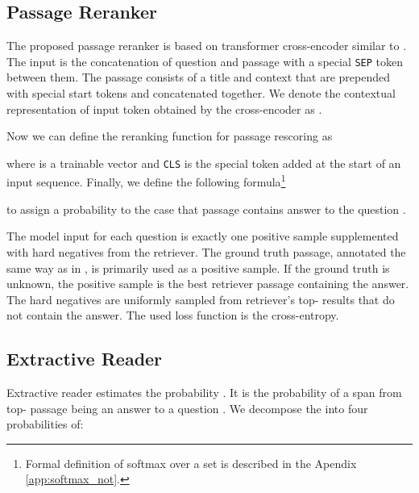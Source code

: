 \documentclass[11pt]{article}
\begin{document}
\subsection{Passage Reranker}\label{ss:reranker}








The proposed passage reranker is based on transformer cross-encoder similar to \citet{nogueira2019passage, luan2020sparse}.
The input is the concatenation of question  and passage  with a special \texttt{SEP} token between them. The passage consists of a title and context that are prepended with special start tokens and concatenated together.
We denote the contextual representation of input token  obtained by the cross-encoder as .

Now we can define the reranking function for passage rescoring as

where  is a trainable vector and \texttt{CLS} is the special token added at the start of an input sequence.
Finally, we define the following formula\footnote{Formal definition of softmax over a set is described in the Apendix \ref{app:softmax_not}.}

to assign a probability to the case that passage  contains answer to the question .

\begin{description}[style=unboxed,leftmargin=0em,listparindent=\parindent]
    \setlength\parskip{0em}
\item[Training.] The model input for each question is exactly one positive sample supplemented with hard negatives from the retriever. The ground truth passage, annotated the same way as in \citet{karpukhin2020dense}, is primarily used as a positive sample. If the ground truth is unknown, the positive sample is the best retriever passage containing the answer.
The hard negatives are uniformly sampled from retriever's top- results that do not contain the answer. 
The used loss function is the cross-entropy.
\end{description}


\subsection{Extractive Reader}
\label{ss:ext_reader}

Extractive reader estimates the probability . 
It is the probability of a span  from top- passage  being an answer to a question . 
We decompose the  into four probabilities of:
\end{document}
